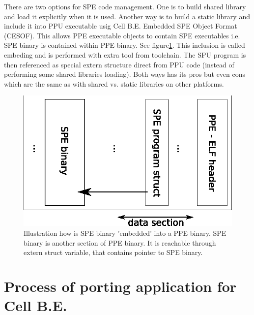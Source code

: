 \par
There are two options for SPE code management.
 One is to build shared library and load it explicitly when it is used.
Another way is to build a static library and include it into PPU executable usig Cell B.E. Embedded SPE Object Format (CESOF).
This allows PPE executable objects to contain SPE executables i.e. SPE binary is contained within PPE binary. See figure\ref{fg:SPEEmbedding}.
This inclusion is called embeding and is performed with extra tool from toolchain.
The SPU program is then referenced as special extern structure direct from PPU code (instead of performing some shared libraries loading).
Both ways has its pros but even cons which are the same as with shared vs. static libraries on other platforms.


\begin{figure}
    \centering
    \includegraphics[height=\textwidth]{data/SPEEmbedding}
    \caption[SPE binary embedding]{Illustration how is SPE binary 'embedded' into a PPE binary.
SPE binary is another section of PPE binary.
It is reachable through extern struct variable, that contains pointer to SPE binary.}
    \label{fg:SPEEmbedding}
\end{figure}



\section {Process of porting application for Cell B.E.}

